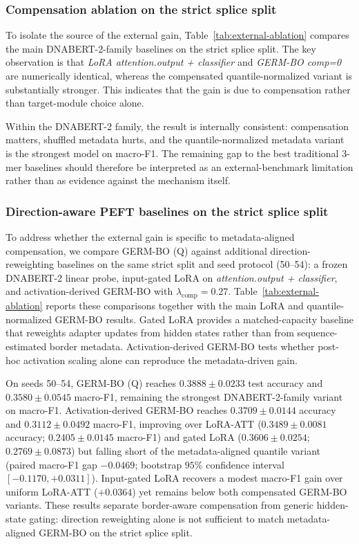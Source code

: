 \documentclass[12pt,letterpaper]{article}
\newcommand{\modpath}[1]{\textit{#1}}
\begin{document}
\subsubsection*{Compensation ablation on the strict splice split}

To isolate the source of the external gain, Table~\ref{tab:external-ablation} compares the main DNABERT-2-family baselines on the strict splice split. The key observation is that \modpath{LoRA attention.output + classifier} and \modpath{GERM-BO comp=0} are numerically identical, whereas the compensated quantile-normalized variant is substantially stronger. This indicates that the gain is due to compensation rather than target-module choice alone.



Within the DNABERT-2 family, the result is internally consistent: compensation matters, shuffled metadata hurts, and the quantile-normalized metadata variant is the strongest model on macro-F1. The remaining gap to the best traditional $3$-mer baselines should therefore be interpreted as an external-benchmark limitation rather than as evidence against the mechanism itself.

\subsubsection*{Direction-aware PEFT baselines on the strict splice split}

To address whether the external gain is specific to metadata-aligned compensation, we compare GERM-BO (Q) against additional direction-reweighting baselines on the same strict split and seed protocol (50--54): a frozen DNABERT-2 linear probe, input-gated LoRA on \modpath{attention.output + classifier}, and activation-derived GERM-BO with $\lambda_{\mathrm{comp}}=0.27$. Table~\ref{tab:external-ablation} reports these comparisons together with the main LoRA and quantile-normalized GERM-BO results. Gated LoRA provides a matched-capacity baseline that reweights adapter updates from hidden states rather than from sequence-estimated border metadata. Activation-derived GERM-BO tests whether post-hoc activation scaling alone can reproduce the metadata-driven gain.

On seeds 50--54, GERM-BO (Q) reaches $0.3888 \pm 0.0233$ test accuracy and $0.3580 \pm 0.0545$ macro-F1, remaining the strongest DNABERT-2-family variant on macro-F1. Activation-derived GERM-BO reaches $0.3709 \pm 0.0144$ accuracy and $0.3112 \pm 0.0492$ macro-F1, improving over LoRA-ATT ($0.3489 \pm 0.0081$ accuracy; $0.2405 \pm 0.0145$ macro-F1) and gated LoRA ($0.3606 \pm 0.0254$; $0.2769 \pm 0.0873$) but falling short of the metadata-aligned quantile variant (paired macro-F1 gap $-0.0469$; bootstrap $95\%$ confidence interval $[-0.1170, +0.0311]$). Input-gated LoRA recovers a modest macro-F1 gain over uniform LoRA-ATT ($+0.0364$) yet remains below both compensated GERM-BO variants. These results separate border-aware compensation from generic hidden-state gating: direction reweighting alone is not sufficient to match metadata-aligned GERM-BO on the strict splice split.
\end{document}
